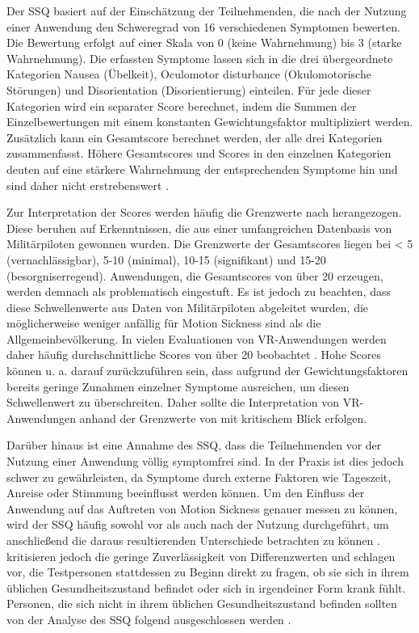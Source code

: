 Der SSQ basiert auf der Einschätzung der Teilnehmenden, die nach der Nutzung einer Anwendung den Schweregrad von 16 verschiedenen Symptomen bewerten. Die Bewertung erfolgt auf einer Skala von 0 (keine Wahrnehmung) bis 3 (starke Wahrnehmung). Die erfassten Symptome lassen sich in die drei übergeordnete Kategorien Nausea (Übelkeit), Oculomotor disturbance (Okulomotorische Störungen) und Disorientation (Disorientierung) einteilen. Für jede dieser Kategorien wird ein separater Score berechnet, indem die Summen der Einzelbewertungen mit einem konstanten Gewichtungsfaktor multipliziert werden. 
Zusätzlich kann ein Gesamtscore berechnet werden, der alle drei Kategorien zusammenfasst. Höhere Gesamtscores und Scores in den einzelnen Kategorien deuten auf eine stärkere Wahrnehmung der entsprechenden Symptome hin und sind daher nicht erstrebenswert \citep{kennedy_simulator_1993}.

Zur Interpretation der Scores werden häufig die Grenzwerte nach \citet{stanney_cybersickness_1997} herangezogen. Diese beruhen auf Erkenntnissen, die aus einer umfangreichen Datenbasis von Militärpiloten gewonnen wurden. Die Grenzwerte der Gesamtscores liegen bei < 5 (vernachlässigbar), 5-10 (minimal), 10-15 (signifikant) und 15-20 (besorgniserregend). Anwendungen, die Gesamtscores von über 20 erzeugen, werden demnach als problematisch eingestuft. Es ist jedoch zu beachten, dass diese Schwellenwerte aus Daten von Militärpiloten abgeleitet wurden, die möglicherweise weniger anfällig für Motion Sickness sind als die Allgemeinbevölkerung. In vielen Evaluationen von VR-Anwendungen werden daher häufig durchschnittliche Scores von über 20 beobachtet \citep{bimberg_usage_2020}. Hohe Scores können u. a. darauf zurückzuführen sein, dass aufgrund der Gewichtungsfaktoren bereits geringe Zunahmen einzelner Symptome ausreichen, um diesen Schwellenwert zu überschreiten. Daher sollte die Interpretation von VR-Anwendungen anhand der Grenzwerte von \citet{stanney_cybersickness_1997} mit kritischem Blick erfolgen. 

Darüber hinaus ist eine Annahme des SSQ, dass die Teilnehmenden vor der Nutzung einer Anwendung völlig symptomfrei sind. In der Praxis ist dies jedoch schwer zu gewährleisten, da Symptome durch externe Faktoren wie Tageszeit, Anreise oder Stimmung beeinflusst werden können. Um den Einfluss der Anwendung auf das Auftreten von Motion Sickness genauer messen zu können, wird der SSQ häufig sowohl vor als auch nach der Nutzung durchgeführt, um anschließend die daraus resultierenden Unterschiede betrachten zu können \citep{bimberg_usage_2020}. \citet{kennedy_simulator_1993} kritisieren jedoch die geringe Zuverlässigkeit von Differenzwerten und schlagen vor, die Testpersonen stattdessen zu Beginn direkt zu fragen, ob sie sich in ihrem üblichen Gesundheitszustand befindet oder sich in irgendeiner Form krank fühlt. Personen, die sich nicht in ihrem üblichen Gesundheitszustand befinden sollten von der Analyse des SSQ folgend ausgeschlossen werden \citep{jerald_vr_2016}.

